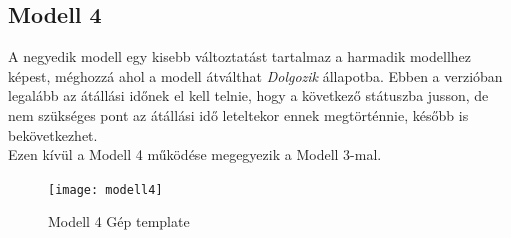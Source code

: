 \documentclass {report}
\begin{document}
\subsection{Modell 4}
A negyedik modell egy kisebb változtatást tartalmaz a harmadik modellhez képest, méghozzá ahol a modell átválthat \emph{Dolgozik} állapotba. Ebben a verzióban legalább az átállási időnek el kell telnie, hogy a következő státuszba jusson, de nem szükséges pont az átállási idő leteltekor ennek megtörténnie, később is bekövetkezhet.\\
Ezen kívül a Modell 4 működése megegyezik a Modell 3-mal.
 \begin{figure}[htpb]
    \begin{center}
   \texttt{[image: modell4]}\\
    \caption{Modell 4 Gép template}
    \end{center}
    \end{figure}\\ 
 
\end{document}
